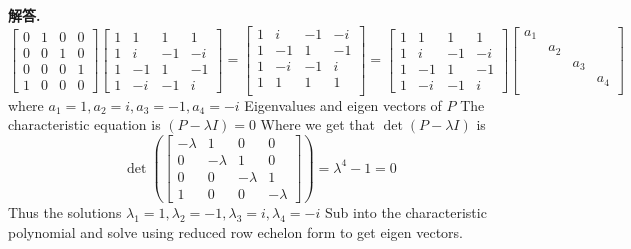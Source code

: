 \documentclass[12pt, a4paper, oneside]{article}
\newenvironment{solution}{\par\noindent\textbf{解答. }}{\par}
\begin{document}
\begin{CJK}{UTF8}{gbsn}
\begin{solution}
  $$
  \begin{bmatrix}
    0 & 1 & 0 & 0 \\
    0 & 0 & 1 & 0 \\ 
    0 & 0 & 0 & 1 \\ 
    1 & 0 & 0 & 0
  \end{bmatrix} 
  \begin{bmatrix}
    1 & 1 & 1 & 1 \\
    1 & i & -1 & -i  \\ 
    1 & -1& 1 & -1 \\
    1 & -i & -1 & i
  \end{bmatrix}
  = 
  \begin{bmatrix}
    1 & i & -1 & -i  \\ 
    1 & -1& 1 & -1 \\
    1 & -i & -1 & i \\
    1 & 1 & 1 & 1 \\
  \end{bmatrix}
  =
  \begin{bmatrix}
    1 & 1 & 1 & 1 \\
    1 & i & -1 & -i  \\ 
    1 & -1& 1 & -1 \\
    1 & -i & -1 & i
  \end{bmatrix}
  \begin{bmatrix}
    a_1 &&&\\
    & a_2 &&\\
    && a_3 &\\
    &&& a_4\\
  \end{bmatrix}
  $$
  where $ a_1 = 1, a_2 = i, a_3 = -1, a_4 = -i$ \newline
  Eigenvalues and eigen vectors of $P$\newline
  The characteristic equation is  $(P - \lambda I) = 0$
  Where we get that $\det(P - \lambda I)$ is 
  $$
    \det\left(\begin{bmatrix}
      -\lambda & 1 & 0 & 0 \\
      0 & -\lambda & 1 & 0 \\ 
      0 & 0 & -\lambda & 1 \\
      1 & 0 & 0 & -\lambda  
    \end{bmatrix}\right) = \lambda^4 - 1 = 0
  $$
  Thus the solutions $\lambda_1 = 1, \lambda_2 = -1, \lambda_3 = i, \lambda_4 = -i$ \newline
  Sub into the characteristic polynomial and solve using reduced row echelon form to get eigen vectors. 

\end{solution}
\end{CJK}
\end{document}
